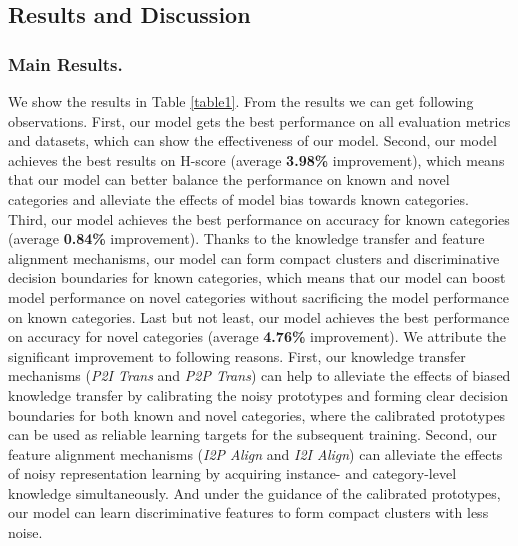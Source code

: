 \documentclass[letterpaper]{article} %
\begin{document}
\subsection{Results and Discussion}

\subsubsection{Main Results. }
We show the results in Table \ref{table1}. From the results we can get following observations.
First, our model gets the best performance on all evaluation metrics and datasets, which can show the effectiveness of our model.
Second, our model achieves the best results on H-score (average \textbf{3.98\%} improvement), which means that our model can better balance the performance on known and novel categories and alleviate the effects of model bias towards known categories.
Third, our model achieves the best performance on accuracy for known categories (average \textbf{0.84\%} improvement). Thanks to the knowledge transfer and feature alignment mechanisms, our model can form compact clusters and discriminative decision boundaries for known categories, which means that our model can boost model performance on novel categories without sacrificing the model performance on known categories.
Last but not least, our model achieves the best performance on accuracy for novel categories (average \textbf{4.76\%} improvement). We attribute the significant improvement to following reasons. First, our knowledge transfer mechanisms (\textit{P2I Trans} and \textit{P2P Trans}) can help to alleviate the effects of biased knowledge transfer by calibrating the noisy prototypes and forming clear decision boundaries for both known and novel categories, where the calibrated prototypes can be used as reliable learning targets for the subsequent training. Second, our feature alignment mechanisms (\textit{I2P Align} and \textit{I2I Align}) can alleviate the effects of noisy representation learning by acquiring instance- and category-level knowledge simultaneously. And under the guidance of the calibrated prototypes, our model can learn discriminative features to form compact clusters with less noise.
\end{document}
